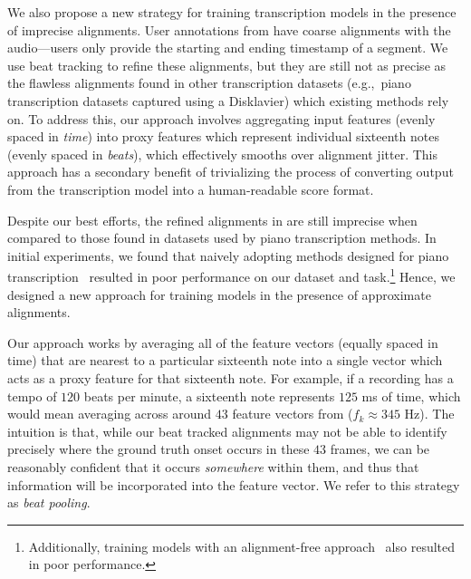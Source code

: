  We also propose a new strategy for training transcription models in the presence of imprecise alignments. 
User annotations from \hooktheory{} have coarse alignments with the audio---users only provide the starting and ending timestamp of a segment. 
We use beat tracking to refine these alignments, but they are still not as precise as the flawless alignments found in other transcription datasets (e.g.,~piano transcription datasets captured using a Disklavier) which existing methods rely on. 
To address this, our approach involves aggregating input features (evenly spaced in \emph{time}) into proxy features which represent individual sixteenth notes (evenly spaced in \emph{beats}), 
which effectively smooths over alignment jitter. 
This approach has a secondary benefit of trivializing the process of converting output from the transcription model into a human-readable score format. %

Despite our best efforts, the refined alignments in \hooktheory{} are still imprecise when compared to those found in datasets used by piano transcription methods. 
In initial experiments, we found that naively adopting methods designed for piano transcription~\cite{hawthorne2017onsets,hawthorne2021sequence} resulted in poor performance on our dataset and task.\footnote{Additionally, training models with an alignment-free approach~\cite{graves2006connectionist} also resulted in poor performance.} 
Hence, we designed a new approach for training models in the presence of approximate alignments. 

Our approach works by averaging all of the feature vectors (equally spaced in time) that are nearest to a particular sixteenth note into a single vector which acts as a proxy feature for that sixteenth note. 
For example, if a recording has a tempo of $120$ beats per minute, a sixteenth note represents $125$ ms of time, which would mean averaging across around $43$ feature vectors from \jukebox{} ($f_k \approx 345$ Hz). 
The intuition is that, while our beat tracked alignments may not be able to identify precisely where the ground truth onset occurs in these $43$ frames, we can be reasonably confident that it occurs \emph{somewhere} within them, and thus that information will be incorporated into the feature vector.
We refer to this strategy as \emph{beat pooling}.

